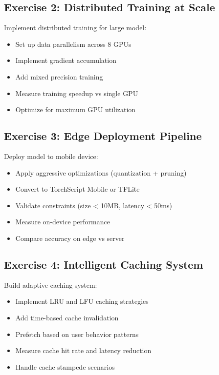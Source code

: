\subsection{Exercise 2: Distributed Training at Scale}

Implement distributed training for large model:
\begin{itemize}
    \item Set up data parallelism across 8 GPUs
    \item Implement gradient accumulation
    \item Add mixed precision training
    \item Measure training speedup vs single GPU
    \item Optimize for maximum GPU utilization
\end{itemize}

\subsection{Exercise 3: Edge Deployment Pipeline}

Deploy model to mobile device:
\begin{itemize}
    \item Apply aggressive optimizations (quantization + pruning)
    \item Convert to TorchScript Mobile or TFLite
    \item Validate constraints (size < 10MB, latency < 50ms)
    \item Measure on-device performance
    \item Compare accuracy on edge vs server
\end{itemize}

\subsection{Exercise 4: Intelligent Caching System}

Build adaptive caching system:
\begin{itemize}
    \item Implement LRU and LFU caching strategies
    \item Add time-based cache invalidation
    \item Prefetch based on user behavior patterns
    \item Measure cache hit rate and latency reduction
    \item Handle cache stampede scenarios
\end{itemize}

